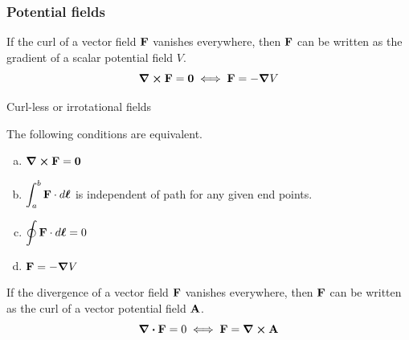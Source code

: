 	\subsubsection{Potential fields}
			If the curl of a vector field $\vb{F}$ vanishes everywhere, then $\vb{F}$ can be written
			as the gradient of a scalar potential field $V$.
			\begin{equation}
				\curl \vb{F} = \vb{0} \iff \vb{F} = -\grad V
			\end{equation}

			\begin{theorem}{Curl-less or irrotational fields}
				\label{thm:irrotational-fields}

				The following conditions are equivalent.
				\begin{enumerate}[(a)]
					\item $\curl \vb{F} = \vb{0}$ 
					\item $\displaystyle\int_a^b \vb{F}\cdot \dd{\vb* \ell}$ is independent of path for any given end points.
					\item $\displaystyle\oint \vb{F} \cdot \dd{\vb* \ell} = 0$ 
					\item $\vb{F} = - \grad V$
				\end{enumerate}
			\end{theorem}
			
			If the divergence of a vector field $\vb{F}$ vanishes everywhere, then $\vb{F}$ can be written
			as the curl of a vector potential field $\vb{A}$.
			\begin{equation}
				\div \vb{F} = 0 \iff \vb{F} = \curl \vb{A}
			\end{equation}

